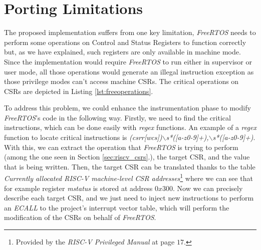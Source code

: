 \section{Porting Limitations}
\label{sec:rtos_limitations}

The proposed implementation suffers from one key limitation, \textit{FreeRTOS} needs
to perform some operations on Control and Status Registers to function correctly
but, as we have explained, such registers are only available in machine mode.
Since the implementation would require \textit{FreeRTOS} to run either in supervisor
or user mode, all those operations would generate an illegal instruction
exception as those privilege modes can't access machine CSRs. The critical operations
on CSRs are depicted in Listing \ref{lst:freeoperations}.

To address this problem, we could enhance the instrumentation phase to modify
\textit{FreeRTOS}'s code in the following way. Firstly, we need to find the critical
instructions, which can be done easily with \textit{regex} functions. An example
of a \textit{regex} function to locate critical instructions is \textit{(csrr[wcs])$\backslash$s*([a-z0-9]+),$\backslash$s*([a-z0-9]+)}.
With this, we can extract the operation that \textit{FreeRTOS} is trying to perform
(among the one seen in Section \ref{sec:riscv_csrs}.), the target CSR, and the
value that is being written. Then, the target CSR can be translated thanks to
the table \textit{Currently allocated RISC-V machine-level CSR addresses}\footnote{Provided
by the \textit{RISC-V Privileged Manual}\cite{riscv} at page $17$.} where we can
see that for example register \textit{mstatus} is stored at address $0x300$. Now
we can precisely describe each target CSR, and we just need to inject new instructions
to perform an \textit{ECALL} to the project's interrupt vector table, which will
perform the modification of the CSRs on behalf of \textit{FreeRTOS}.

